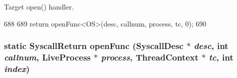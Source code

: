 Target open() handler. 


\begin{DoxyCode}
688 {
689     return openFunc<OS>(desc, callnum, process, tc, 0);
690 }
\end{DoxyCode}
\hypertarget{syscall__emul_8hh_ae8b330340cfb5e878941b80c190e1bcb}{
\subsubsection[{openFunc}]{\setlength{\rightskip}{0pt plus 5cm}static {\bf SyscallReturn} openFunc ({\bf SyscallDesc} $\ast$ {\em desc}, \/  int {\em callnum}, \/  {\bf LiveProcess} $\ast$ {\em process}, \/  {\bf ThreadContext} $\ast$ {\em tc}, \/  int {\em index})}}
\label{syscall__emul_8hh_ae8b330340cfb5e878941b80c190e1bcb}



